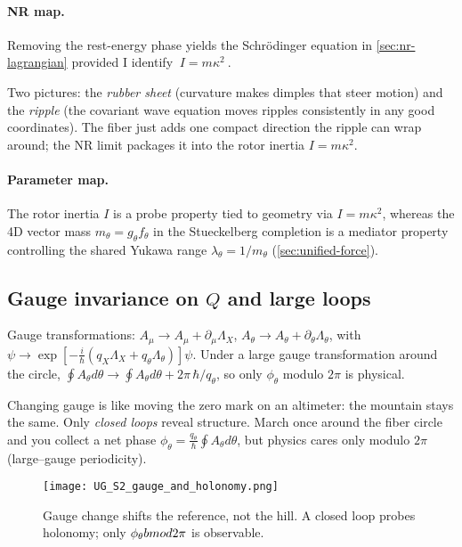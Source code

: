 \paragraph{NR map.} Removing the rest-energy phase yields the Schr\"odinger equation in \cref{sec:nr-lagrangian} provided I identify $\boxed{\ I=m\kappa^2\ }$.

\begin{idea}
Two pictures: the \emph{rubber sheet} (curvature makes dimples that steer motion) and the \emph{ripple} (the covariant wave equation moves ripples consistently in any good coordinates). The fiber just adds one compact direction the ripple can wrap around; the NR limit packages it into the rotor inertia $I=m\kappa^2$.
\end{idea}

\paragraph{Parameter map.} The rotor inertia $I$ is a probe property tied to geometry via $I=m\kappa^2$, whereas the 4D vector mass $m_\theta=g_\theta f_\theta$ in the Stueckelberg completion is a mediator property controlling the shared Yukawa range $\lambda_\theta=1/m_\theta$ (\cref{sec:unified-force}).

\subsection{Gauge invariance on \texorpdfstring{$Q$}{Q} and large loops}\label{sec:gauge-invariance}
Gauge transformations: $A_\mu\to A_\mu+\partial_\mu\Lambda_X$, $A_\theta\to A_\theta+\partial_\theta\Lambda_\theta$, with $\psi\to \exp\!\left[-\tfrac{i}{\hbar}(q_X\Lambda_X+q_\theta\Lambda_\theta)\right]\psi$. Under a large gauge transformation around the circle, $\oint A_\theta d\theta \to \oint A_\theta d\theta + 2\pi\,\hbar/q_\theta$, so only $\phi_\theta$ modulo $2\pi$ is physical.

\begin{idea}
Changing gauge is like moving the zero mark on an altimeter: the mountain stays the same. Only \emph{closed loops} reveal structure. March once around the fiber circle and you collect a net phase $\phi_\theta=\tfrac{q_\theta}{\hbar}\oint A_\theta d\theta$, but physics cares only modulo $2\pi$ (large–gauge periodicity).
\end{idea}

\begin{figure}[h]
  \centering
  \texttt{[image: UG\_S2\_gauge\_and\_holonomy.png]}
  \caption{Gauge change shifts the reference, not the hill. A closed loop probes holonomy; only $\phi_\theta \\bmod 2\pi$ is observable.}
\end{figure}

